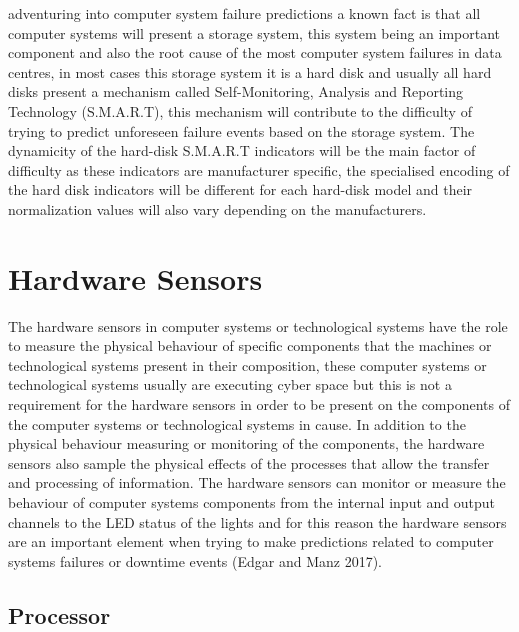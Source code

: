 adventuring into computer system failure predictions a known fact is that all computer systems will present
a storage system, this system being an important component and also the root cause of the most computer system
failures in data centres, in most cases this storage system it is a hard disk and usually all hard disks present
a mechanism called Self-Monitoring, Analysis and Reporting Technology (S.M.A.R.T), this mechanism will contribute
to the difficulty of trying to predict unforeseen failure events based on the storage system. The dynamicity of
the hard-disk S.M.A.R.T indicators will be the main factor of difficulty as these indicators are manufacturer
specific, the specialised encoding of the hard disk indicators will be different for each hard-disk model and
their normalization values will also vary depending on the manufacturers.

\newpage

\section{Hardware Sensors}

The hardware sensors in computer systems or technological systems have the role to measure the physical behaviour
of specific components that the machines or technological systems present in their composition, these computer
systems or technological systems usually are executing cyber space but this is not a requirement for the hardware
sensors in order to be present on the components of the computer systems or technological systems in cause.
In addition to the physical behaviour measuring or monitoring of the components, the hardware sensors also
sample the physical effects of the processes that allow the transfer and processing of information.
The hardware sensors can monitor or measure the behaviour of computer systems components from the internal
input and output channels to the LED status of the lights and for this reason the hardware sensors are an
important element when trying to make predictions related to computer systems failures or downtime events
(Edgar and Manz 2017).

\subsection{Processor}

